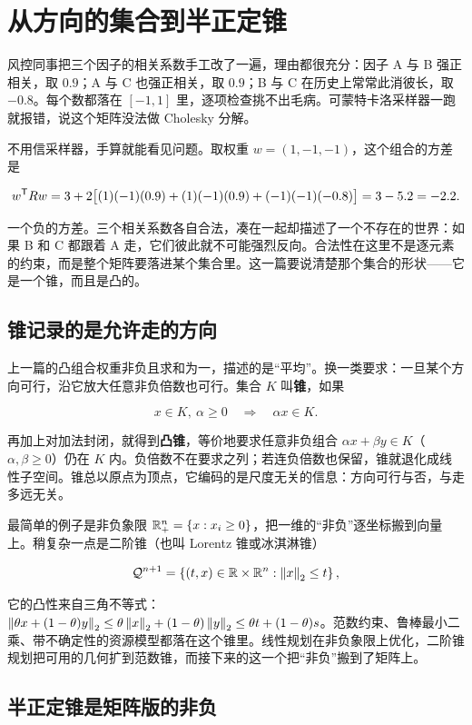\section{从方向的集合到半正定锥}
\label{sec:09-Convex-Optimization/02-Convex-Sets/03}

风控同事把三个因子的相关系数手工改了一遍，理由都很充分：因子 A 与 B 强正相关，取 \(0.9\)；A 与 C 也强正相关，取 \(0.9\)；B 与 C 在历史上常常此消彼长，取 \(-0.8\)。每个数都落在 \([-1,1]\) 里，逐项检查挑不出毛病。可蒙特卡洛采样器一跑就报错，说这个矩阵没法做 Cholesky 分解。

不用信采样器，手算就能看见问题。取权重 \(w=(1,-1,-1)\)，这个组合的方差是

\[
w^{\mathsf{T}}Rw=3+2\bigl[(1)(-1)(0.9)+(1)(-1)(0.9)+(-1)(-1)(-0.8)\bigr]=3-5.2=-2.2.
\]

一个负的方差。三个相关系数各自合法，凑在一起却描述了一个不存在的世界：如果 B 和 C 都跟着 A 走，它们彼此就不可能强烈反向。合法性在这里不是逐元素的约束，而是整个矩阵要落进某个集合里。这一篇要说清楚那个集合的形状——它是一个锥，而且是凸的。

\subsection{锥记录的是允许走的方向}

上一篇的凸组合权重非负且求和为一，描述的是``平均''。换一类要求：一旦某个方向可行，沿它放大任意非负倍数也可行。集合 \(K\) 叫\textbf{锥}，如果

\[
x\in K,\ \alpha\ge0\quad\Longrightarrow\quad\alpha x\in K.
\]

再加上对加法封闭，就得到\textbf{凸锥}，等价地要求任意非负组合 \(\alpha x+\beta y\in K\)（\(\alpha,\beta\ge0\)）仍在 \(K\) 内。负倍数不在要求之列；若连负倍数也保留，锥就退化成线性子空间。锥总以原点为顶点，它编码的是尺度无关的信息：方向可行与否，与走多远无关。

最简单的例子是非负象限 \(\mathbb{R}_+^n=\left\{x:x_i\ge0\right\}\)，把一维的``非负''逐坐标搬到向量上。稍复杂一点是二阶锥（也叫 Lorentz 锥或冰淇淋锥）

\[
\mathcal{Q}^{n+1}=\left\{(t,x)\in\mathbb{R}\times\mathbb{R}^n:\left\lVert x\right\rVert_2\le t\right\},
\]

它的凸性来自三角不等式：\(\left\lVert\theta x+(1-\theta)y\right\rVert_2\le\theta\left\lVert x\right\rVert_2+(1-\theta)\left\lVert y\right\rVert_2\le\theta t+(1-\theta)s\)。范数约束、鲁棒最小二乘、带不确定性的资源模型都落在这个锥里。线性规划在非负象限上优化，二阶锥规划把可用的几何扩到范数锥，而接下来的这一个把``非负''搬到了矩阵上。

\subsection{半正定锥是矩阵版的非负}


